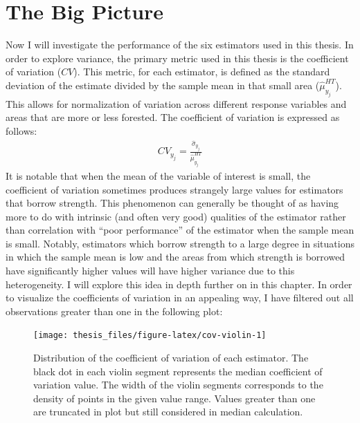 \documentclass[12pt,twoside]{reedthesis}
\begin{document}
\hypertarget{the-big-picture}{%
\section{The Big Picture}\label{the-big-picture}}

Now I will investigate the performance of the six estimators used in this thesis. In order to explore variance, the primary metric used in this thesis is the coefficient of variation (\(CV\)). This metric, for each estimator, is defined as the standard deviation of the estimate divided by the sample mean in that small area (\(\hat \mu_{y_j}^{HT}\)). This allows for normalization of variation across different response variables and areas that are more or less forested. The coefficient of variation is expressed as follows:
\begin{align}
CV_{y_j} = \frac{\hat\sigma_{y_j}}{\hat\mu_{y_j}^{HT}}
\end{align}
It is notable that when the mean of the variable of interest is small, the coefficient of variation sometimes produces strangely large values for estimators that borrow strength. This phenomenon can generally be thought of as having more to do with intrinsic (and often very good) qualities of the estimator rather than correlation with ``poor performance'' of the estimator when the sample mean is small. Notably, estimators which borrow strength to a large degree in situations in which the sample mean is low and the areas from which strength is borrowed have significantly higher values will have higher variance due to this heterogeneity. I will explore this idea in depth further on in this chapter.
\clearpage
In order to visualize the coefficients of variation in an appealing way, I have filtered out all observations greater than one in the following plot:
\begin{figure}

{\centering \texttt{[image: thesis\_files/figure-latex/cov-violin-1]} 

}

\caption[Distribution of the coefficient of variation of each estimator]{Distribution of the coefficient of variation of each estimator. The black dot in each violin segment represents the median coefficient of variation value. The width of the violin segments corresponds to the density of points in the given value range. Values greater than one are truncated in plot but still considered in median calculation.}\label{fig:cov-violin}
\end{figure}
\end{document}

